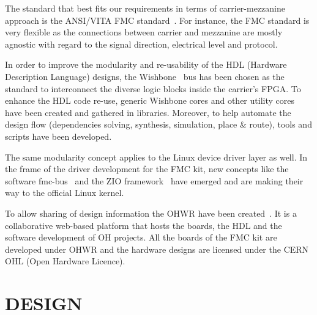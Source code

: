 \documentclass{JAC2003}
\begin{document}
The standard that best fits our requirements in terms of carrier-mezzanine approach is the ANSI/VITA FMC standard~\cite{fmc}.
For instance, the FMC standard is very flexible as the connections between carrier and mezzanine are mostly agnostic with regard to the signal direction, electrical level and protocol.

In order to improve the modularity and re-usability of the HDL (Hardware Description Language) designs, the Wishbone~\cite{wishbone} bus has been chosen as the standard to interconnect the diverse logic blocks inside the carrier's FPGA.
To enhance the HDL code re-use, generic Wishbone cores and other utility cores have been created and gathered in libraries.
Moreover, to help automate the design flow (dependencies solving, synthesis, simulation, place \& route), tools and scripts have been developed.

The same modularity concept applies to the Linux device driver layer as well.
In the frame of the driver development for the FMC kit, new concepts like the software fmc-bus~\cite{fmc-bus} and the ZIO framework~\cite{zio} have emerged and are making their way to the official Linux kernel.

To allow sharing of design information the OHWR have been created~\cite{icalepcs}.
It is a collaborative web-based platform that hosts the boards, the HDL and the software development of OH projects.
All the boards of the FMC kit are developed under OHWR and the hardware designs are licensed under the CERN OHL (Open Hardware Licence).

\section{DESIGN}
\end{document}
